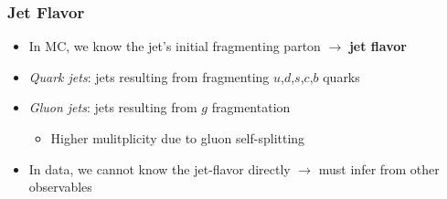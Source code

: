 \begin{frame}
  \frametitle{\textbf{Jet Flavor}}
  \begin{itemize}
  \item In MC, we know the jet's initial fragmenting parton $\to$ \textbf{jet flavor}
  \item \textit{Quark jets}: jets resulting from fragmenting $u$,$d$,$s$,$c$,$b$ quarks
  \item \textit{Gluon jets}: jets resulting from $g$ fragmentation
    \begin{itemize}
    \item Higher mulitplicity due to gluon self-splitting
    \end{itemize}
  \item In data, we cannot know the jet-flavor directly $\to$ must infer from other observables
  \end{itemize}

  \

  \begin{columns}
  \end{columns}
\end{frame}
